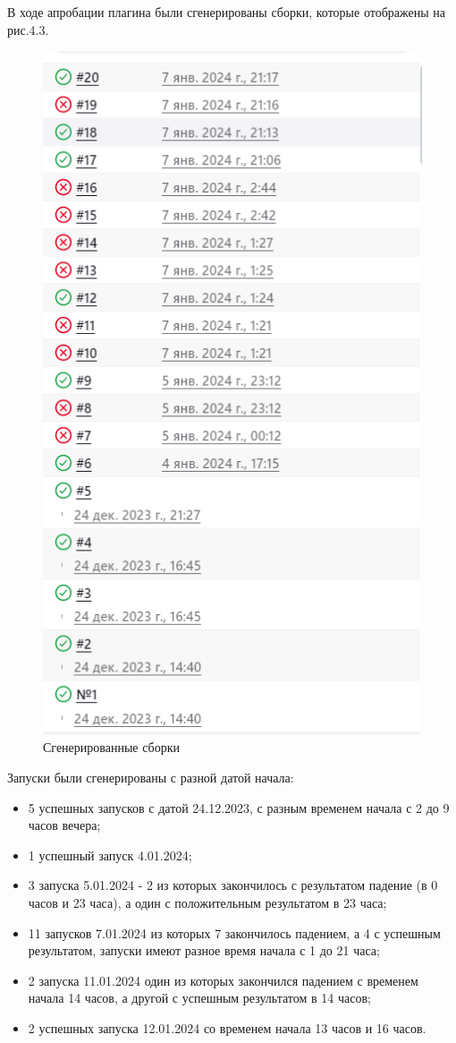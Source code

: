  В ходе апробации плагина были сгенерированы сборки, которые отображены на рис.4.3.
 
 \begin{figure}[ht!] 
	\center
	\includegraphics [scale=0.47] {my_folder/images//builds}
	\caption{Сгенерированные сборки} 
	\label{fig:builds}  
\end{figure}

Запуски были сгенерированы с разной датой начала:

\begin{itemize}
	\item 5 успешных запусков с датой 24.12.2023, с разным временем начала с 2 до 9 часов вечера;
	\item 1 успешный запуск 4.01.2024;
	\item 3 запуска 5.01.2024 - 2 из которых закончилось с результатом падение (в 0 часов и 23 часа), а один с положительным результатом в 23 часа;
	\item 11 запусков 7.01.2024 из которых 7 закончилось падением, а 4 с успешным результатом, запуски имеют разное время начала с 1 до 21 часа;
	\item 2 запуска 11.01.2024 один из которых закончился падением с временем начала 14 часов, а другой с успешным результатом в 14 часов;
	\item 2 успешных запуска 12.01.2024 со временем начала 13 часов и 16 часов.
\end{itemize}


